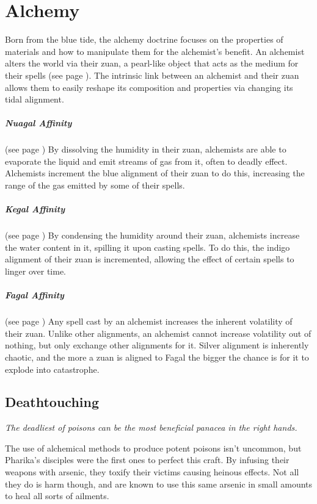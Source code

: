 \section{Alchemy} \label{sec::alchemy} %
Born from the blue tide, the alchemy doctrine focuses on the properties of materials and how to manipulate them for the alchemist's benefit.
An alchemist alters the world via their zuan, a pearl-like object that acts as the medium for their spells (see page \pageref{item::zuan}).
The intrinsic link between an alchemist and their zuan allows them to easily reshape its composition and properties via changing its tidal alignment.

\subparagraph{Nuagal Affinity}
    (see page \pageref{medium::dissolve})
    By dissolving the humidity in their zuan, alchemists are able to evaporate the liquid and emit streams of gas from it, often to deadly effect.
    Alchemists increment the blue alignment of their zuan to do this, increasing the range of the gas emitted by some of their spells.

\subparagraph{Kegal Affinity}
    (see page \pageref{medium::condense})
    By condensing the humidity around their zuan, alchemists increase the water content in it, spilling it upon casting spells.
    To do this, the indigo alignment of their zuan is incremented, allowing the effect of certain spells to linger over time.

\subparagraph{Fagal Affinity}
    (see page \pageref{medium::volatilize})
    Any spell cast by an alchemist increases the inherent volatility of their zuan.
    Unlike other alignments, an alchemist cannot increase volatility out of nothing, but only exchange other alignments for it.
    Silver alignment is inherently chaotic, and the more a zuan is aligned to Fagal the bigger the chance is for it to explode into catastrophe.

\subsection*{Deathtouching} \label{ssec::deathtouching}
    \textit{The deadliest of poisons can be the most beneficial panacea in the right hands.}

    The use of alchemical methods to produce potent poisons isn't uncommon, but Pharika's disciples were the first ones to perfect this craft.
    By infusing their weapons with arsenic, they toxify their victims causing heinous effects.
    Not all they do is harm though, and are known to use this same arsenic in small amounts to heal all sorts of ailments.

